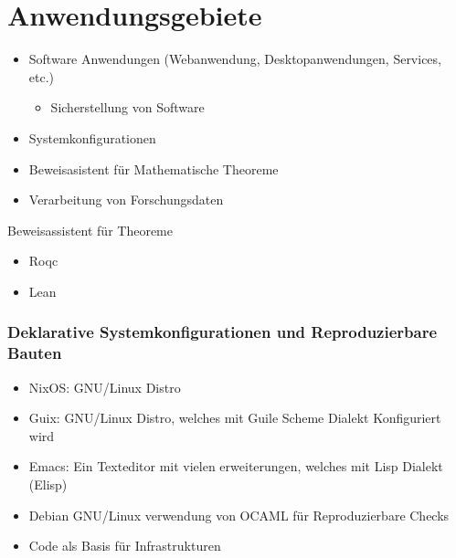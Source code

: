 \documentclass{beamer}
\begin{document}
\section{Anwendungsgebiete}
\begin{frame}
	\begin{itemize}
            \item Software Anwendungen (Webanwendung, Desktopanwendungen, Services, etc.)
            \begin{itemize}
            \item  Sicherstellung von Software
            \end{itemize}
		\item Systemkonfigurationen
		\item Beweisasistent für Mathematische Theoreme
            \item Verarbeitung von Forschungsdaten
    \end{itemize}
\end{frame}

\begin{frame}{Beweisassistent für Theoreme}
\centering
    \begin{itemize}
        \item  Roqc 
        \item  Lean 
    \end{itemize}

\end{frame}

\begin{frame}
\frametitle{Deklarative Systemkonfigurationen und Reproduzierbare Bauten}
 \begin{itemize}
		\item NixOS: GNU/Linux Distro
		\item Guix: GNU/Linux Distro, welches mit Guile Scheme Dialekt Konfiguriert wird
		\item Emacs: Ein Texteditor mit vielen erweiterungen, welches mit Lisp Dialekt (Elisp)
		\item Debian GNU/Linux verwendung von OCAML für Reproduzierbare Checks
        \item Code als Basis für Infrastrukturen
\end{itemize}

\end{frame}
\end{document}
